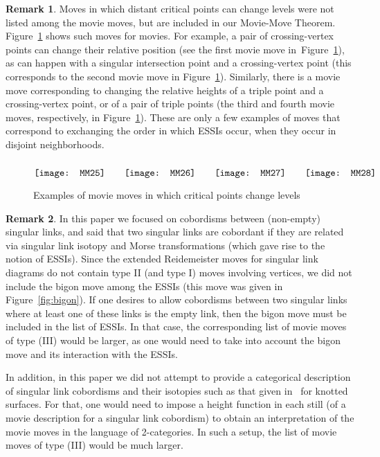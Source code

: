 \documentclass{amsart}\usepackage{amsfonts, amsmath, amssymb}\usepackage{graphicx, epic, epsf, enumerate, stmaryrd}
\theoremstyle{definition}
\newtheorem{remark}{Remark}
\numberwithin{equation}{section}
\begin{document}
\begin{remark}
Moves in which distant critical points can change levels were not listed among the movie moves, but are included in our Movie-Move Theorem. Figure~\ref{fig:exchanges} shows such moves for movies. For example, a pair of crossing-vertex points can change their relative position (see the first movie move in~Figure~\ref{fig:exchanges}), as can happen with a  singular intersection point and a crossing-vertex point (this corresponds to the second movie move in Figure~\ref{fig:exchanges}).
Similarly, there is a movie move corresponding to changing the relative heights of a triple point and a crossing-vertex point, or of a pair of triple points (the third and fourth movie moves, respectively, in Figure~\ref{fig:exchanges}). These are only a few examples of moves that correspond to exchanging the order in which ESSIs occur, when they occur in disjoint neighborhoods.

\begin{figure}[ht]
\[
\raisebox{-15pt}{\texttt{[image: MM25]}} \hspace{0.7cm} \raisebox{-15pt}{\texttt{[image: MM26]}} \hspace{0.7cm}
\raisebox{-15pt}{\texttt{[image: MM27]}} \hspace{0.7cm} \raisebox{-15pt}{\texttt{[image: MM28]}}  \]
\caption{Examples of movie moves in which critical points change levels} \label{fig:exchanges} 
\end{figure}
\end{remark}

\begin{remark}
In this paper we focused on cobordisms between (non-empty) singular links, and said that two singular links are cobordant if they are related via singular link isotopy and Morse transformations (which gave rise to the notion of ESSIs). Since the extended Reidemeister moves for singular link diagrams do not contain type II (and type I) moves involving vertices, we did not include the bigon move among the ESSIs (this move was given in Figure~\ref{fig:bigon}). If one desires to allow cobordisms between two singular links where at least one of these links is the empty link, then the bigon move must be included in the list of ESSIs. In that case, the corresponding list of movie moves of type (III) would be larger, as one would need to take into account the bigon move and its interaction with the ESSIs.

In addition, in this paper we did not attempt to provide a categorical description of singular link cobordisms and their isotopies such as that given in~\cite{CRS} for knotted surfaces. For that, one would need to impose a height function in each still (of a movie description for a singular link cobordism) to obtain an interpretation of the movie moves in the language of 2-categories. In such a setup, the list of movie moves of type (III) would be much larger.
\end{remark}
\end{document}
